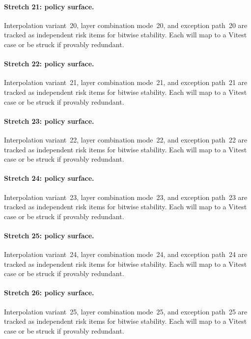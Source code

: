 \documentclass[sigconf,nonacm]{acmart}
\begin{document}
\paragraph{Stretch 21: policy surface.}
Interpolation variant~20, layer combination mode~20, and exception path~20 are tracked as independent risk items for bitwise stability. Each will map to a Vitest case or be struck if provably redundant. %

\paragraph{Stretch 22: policy surface.}
Interpolation variant~21, layer combination mode~21, and exception path~21 are tracked as independent risk items for bitwise stability. Each will map to a Vitest case or be struck if provably redundant. %

\paragraph{Stretch 23: policy surface.}
Interpolation variant~22, layer combination mode~22, and exception path~22 are tracked as independent risk items for bitwise stability. Each will map to a Vitest case or be struck if provably redundant. %

\paragraph{Stretch 24: policy surface.}
Interpolation variant~23, layer combination mode~23, and exception path~23 are tracked as independent risk items for bitwise stability. Each will map to a Vitest case or be struck if provably redundant. %

\paragraph{Stretch 25: policy surface.}
Interpolation variant~24, layer combination mode~24, and exception path~24 are tracked as independent risk items for bitwise stability. Each will map to a Vitest case or be struck if provably redundant. %

\paragraph{Stretch 26: policy surface.}
Interpolation variant~25, layer combination mode~25, and exception path~25 are tracked as independent risk items for bitwise stability. Each will map to a Vitest case or be struck if provably redundant. %
\end{document}
